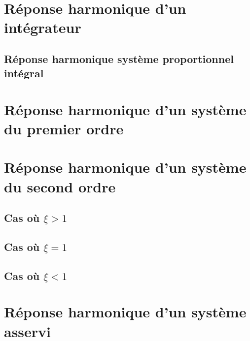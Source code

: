 \documentclass[10pt,oneside]{article}
\begin{document}
\section{Réponse harmonique d'un intégrateur}

\subsection{Réponse harmonique système proportionnel intégral}

\section{Réponse harmonique d'un système du premier ordre}

\section{Réponse harmonique d'un système du second ordre}

\subsection{Cas où $\xi>1$}
\subsection{Cas où $\xi=1$}
\subsection{Cas où $\xi<1$}
\section{Réponse harmonique d'un système asservi}

\begin{thebibliography}{2}

\end{thebibliography}
\end{document}
